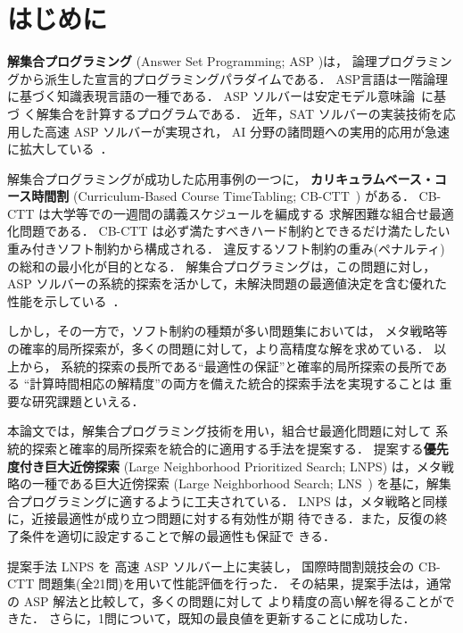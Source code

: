 \section{はじめに}

\textbf{解集合プログラミング}
(Answer Set Programming; ASP
\cite{%
  baral03:cambridge,%
  DBLP:conf/iclp/GelfondL88,%
  DBLP:journals/amai/Niemela99})は，
論理プログラミングから派生した宣言的プログラミングパラダイムである．
ASP言語は一階論理に基づく知識表現言語の一種である．
ASP ソルバーは安定モデル意味論~\cite{DBLP:conf/iclp/GelfondL88}に基づ
く解集合を計算するプログラムである．
近年，SAT ソルバーの実装技術を応用した高速 ASP ソルバーが実現され，
AI 分野の諸問題への実用的応用が急速に拡大している~\cite{ergele16a}．

解集合プログラミングが成功した応用事例の一つに，
\textbf{カリキュラムベース・コース時間割}
(Curriculum-Based Course TimeTabling; CB-CTT~\cite{DBLP:journals/anor/BonuttiCGS12})
がある．
CB-CTT は大学等での一週間の講義スケジュールを編成する
求解困難な組合せ最適化問題である．
CB-CTT は必ず満たすべきハード制約とできるだけ満たしたい
重み付きソフト制約から構成される．
違反するソフト制約の重み(ペナルティ)の総和の最小化が目的となる．
解集合プログラミングは，この問題に対し，
ASP ソルバーの系統的探索を活かして，未解決問題の最適値決定を含む優れた
性能を示している~\cite{anor/Banbara2019}．

しかし，その一方で，ソフト制約の種類が多い問題集においては，
メタ戦略等の確率的局所探索が，多くの問題に対して，より高精度な解を求めている．
以上から，
系統的探索の長所である``最適性の保証''と確率的局所探索の長所である
``計算時間相応の解精度''の両方を備えた統合的探索手法を実現することは
重要な研究課題といえる．

本論文では，解集合プログラミング技術を用い，組合せ最適化問題に対して
系統的探索と確率的局所探索を統合的に適用する手法を提案する．
%
提案する\textbf{優先度付き巨大近傍探索}
(Large Neighborhood Prioritized Search; LNPS)
は，メタ戦略の一種である巨大近傍探索
(Large Neighborhood Search; LNS~\cite{Pisinger10})
を基に，解集合プログラミングに適するように工夫されている．
LNPS は，メタ戦略と同様に，近接最適性が成り立つ問題に対する有効性が期
待できる．また，反復の終了条件を適切に設定することで解の最適性も保証で
きる．


提案手法 LNPS を 高速 ASP ソルバー{\clingo}上に実装し，
国際時間割競技会の CB-CTT 問題集(全21問)を用いて性能評価を行った．
その結果，提案手法は，通常の ASP 解法と比較して，多くの問題に対して
より精度の高い解を得ることができた．
さらに，1問について，既知の最良値を更新することに成功した．

